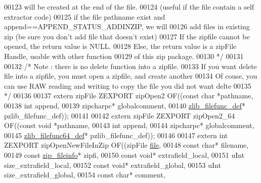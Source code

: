 \begin{DoxyCode}
00123 \textcolor{comment}{       will be created at the end of the file.}
00124 \textcolor{comment}{         (useful if the file contain a self extractor code)}
00125 \textcolor{comment}{     if the file pathname exist and append==APPEND\_STATUS\_ADDINZIP, we will}
00126 \textcolor{comment}{       add files in existing zip (be sure you don't add file that doesn't exist)}
00127 \textcolor{comment}{     If the zipfile cannot be opened, the return value is NULL.}
00128 \textcolor{comment}{     Else, the return value is a zipFile Handle, usable with other function}
00129 \textcolor{comment}{       of this zip package.}
00130 \textcolor{comment}{*/}
00131 
00132 \textcolor{comment}{/* Note : there is no delete function into a zipfile.}
00133 \textcolor{comment}{   If you want delete file into a zipfile, you must open a zipfile, and create another}
00134 \textcolor{comment}{   Of couse, you can use RAW reading and writing to copy the file you did not want delte}
00135 \textcolor{comment}{*/}
00136 
00137 \textcolor{keyword}{extern} zipFile ZEXPORT zipOpen2 OF((\textcolor{keyword}{const} \textcolor{keywordtype}{char} *pathname,
00138                                    \textcolor{keywordtype}{int} append,
00139                                    zipcharpc* globalcomment,
00140                                    \hyperlink{structzlib__filefunc__def__s}{zlib\_filefunc\_def}* pzlib\_filefunc\_def));
00141 
00142 \textcolor{keyword}{extern} zipFile ZEXPORT zipOpen2\_64 OF((\textcolor{keyword}{const} \textcolor{keywordtype}{void} *pathname,
00143                                    \textcolor{keywordtype}{int} append,
00144                                    zipcharpc* globalcomment,
00145                                    \hyperlink{structzlib__filefunc64__def__s}{zlib\_filefunc64\_def}* pzlib\_filefunc\_def));
00146 
00147 \textcolor{keyword}{extern} \textcolor{keywordtype}{int} ZEXPORT zipOpenNewFileInZip OF((zipFile \hyperlink{structfile}{file},
00148                        \textcolor{keyword}{const} \textcolor{keywordtype}{char}* filename,
00149                        \textcolor{keyword}{const} \hyperlink{structzip__fileinfo}{zip\_fileinfo}* zipfi,
00150                        \textcolor{keyword}{const} \textcolor{keywordtype}{void}* extrafield\_local,
00151                        uInt size\_extrafield\_local,
00152                        \textcolor{keyword}{const} \textcolor{keywordtype}{void}* extrafield\_global,
00153                        uInt size\_extrafield\_global,
00154                        \textcolor{keyword}{const} \textcolor{keywordtype}{char}* comment,

\end{DoxyCode}
